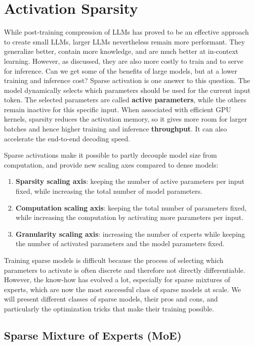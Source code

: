 \section{Activation Sparsity}
While post-training compression of LLMs has proved to be an effective approach
to create small LLMs, larger LLMs nevertheless remain more performant.
They generalize better, contain more knowledge, and are much better at
in-context learning. However, as discussed, they are also more costly to train
and to serve for inference. Can we get some of the benefits of large models,
but at a lower training and inference cost? Sparse activation is one answer
to this question. The model dynamically selects which parameters should be used 
for the current input token. The selected parameters are called \textbf{active parameters}, 
while the others remain inactive for this specific input.
When associated with efficient GPU kernels, sparsity reduces the activation memory,
so it gives more room for larger batches and hence higher training and inference \textbf{throughput}. 
It can also accelerate the end-to-end decoding speed.

Sparse activations make it possible to partly decouple model size from
computation, and provide new scaling axes compared to dense models:

\begin{enumerate}
    \item \textbf{Sparsity scaling axis}: keeping the number of active parameters per input fixed, 
    while increasing the total number of model parameters.
    \item \textbf{Computation scaling axis}: keeping the total number of parameters fixed, 
    while increasing the computation by activating more parameters per input.
    \item \textbf{Granularity scaling axis}: increasing the number of experts while keeping 
    the number of activated parameters and the model parameters fixed.
\end{enumerate}
Training sparse models is difficult because the process of selecting which
parameters to activate is often discrete and therefore not directly
differentiable. However, the know-how has evolved a lot, especially for
sparse mixtures of experts, which are now the most successful class of sparse models at
scale. We will present different classes of sparse models, their pros and cons,
and particularly the optimization tricks that make their training possible.

\subsection{Sparse Mixture of Experts (MoE)}

